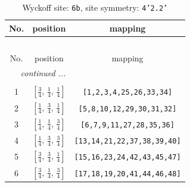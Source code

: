 \documentclass[fleqn,8pt]{jsarticle}
\begin{document}
\begin{longtable}{ccc}
\caption{Wyckoff site: {\tt 6b}, site symmetry: {\tt 4'2.2'}}
 \\
 \hline \hline
No. & position & mapping \\ \hline \endfirsthead

\multicolumn{2}{l}{\tablename\ \thetable{}} \\
 \hline \hline
No. & position & mapping \\ \hline \endhead

 \hline \hline
\multicolumn{2}{r}{\footnotesize\it continued ...} \\ \endfoot

 \hline \hline
\multicolumn{2}{r}{} \\ \endlastfoot

1 & $\left[ \frac{3}{4},\, \frac{1}{4},\, \frac{1}{4} \right]$ & {\tt [1,2,3,4,25,26,33,34]} \\ \hline
2 & $\left[ \frac{1}{4},\, \frac{3}{4},\, \frac{1}{4} \right]$ & {\tt [5,8,10,12,29,30,31,32]} \\ \hline
3 & $\left[ \frac{1}{4},\, \frac{1}{4},\, \frac{3}{4} \right]$ & {\tt [6,7,9,11,27,28,35,36]} \\ \hline
4 & $\left[ \frac{1}{4},\, \frac{3}{4},\, \frac{3}{4} \right]$ & {\tt [13,14,21,22,37,38,39,40]} \\ \hline
5 & $\left[ \frac{3}{4},\, \frac{3}{4},\, \frac{1}{4} \right]$ & {\tt [15,16,23,24,42,43,45,47]} \\ \hline
6 & $\left[ \frac{3}{4},\, \frac{1}{4},\, \frac{3}{4} \right]$ & {\tt [17,18,19,20,41,44,46,48]} \\
\end{longtable}
\renewcommand{\arraystretch}{1.2}
\end{document}
